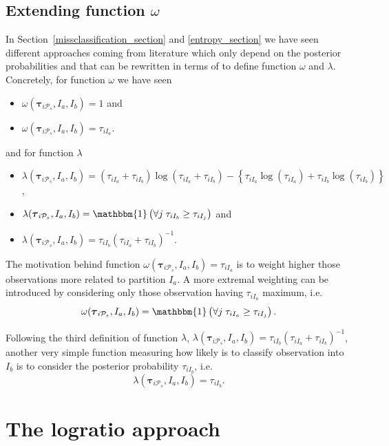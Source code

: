 \documentclass[10pt, a4paper]{article}
\newcommand{\m}[1]{\boldsymbol{#1}}
\begin{document}
\begin{spacing}{1.9}
\subsection{Extending function $\omega$}

In Section~\ref{missclassification_section} and \ref{entropy_section} we have seen different approaches coming from literature which only depend on the posterior probabilities and that can be rewritten in terms of to define function $\omega$ and $\lambda$. Concretely, for function $\omega$ we have seen
\begin{itemize}
\item $\omega(\m\tau_{i \mathcal{P}_s},  I_a,  I_b) = 1$ and
\item $\omega(\m\tau_{i \mathcal{P}_s},  I_a,  I_b) = \tau_{iI_a}$.
\end{itemize}
and for function $\lambda$ 
\begin{itemize}
\item $\lambda(\m\tau_{i \mathcal{P}_s},  I_a,  I_b) =  (\tau_{iI_a}+\tau_{iI_b}) \log(\tau_{iI_a} + \tau_{iI_b}) - \left\{ \tau_{iI_a} \log(\tau_{iI_a}) + \tau_{iI_b} \log(\tau_{iI_b}) \right\}$,
\item $\lambda(\m\tau_{i \mathcal{P}_s},  I_a,  I_b) = \mathbbm{1}\left( \forall j\; \tau_{i I_{b}} \geq \tau_{iI_j} \right)$ and
\item $\lambda(\m\tau_{i \mathcal{P}_s},  I_a,  I_b) = \tau_{iI_b} (\tau_{iI_a} + \tau_{iI_b})^{-1}$.
\end{itemize}

The motivation behind function $\omega(\m\tau_{i \mathcal{P}_s},  I_a,  I_b) = \tau_{iI_a}$ is to weight higher those observations more related to partition $I_a$. A more extremal weighting can be introduced by considering only those observation having $ \tau_{iI_a}$ maximum, i.e.
\[
\omega(\m\tau_{i \mathcal{P}_s},  I_a,  I_b) = \mathbbm{1}\left( \forall j\; \tau_{i I_{a}} \geq \tau_{iI_j} \right).
\]

Following the third definition of function $\lambda$, $\lambda(\m\tau_{i \mathcal{P}_s},  I_a,  I_b) = \tau_{iI_b} (\tau_{iI_a} + \tau_{iI_b})^{-1}$, another very simple function measuring how likely is to classify observation into $I_b$ is to consider the posterior probability $\tau_{i I_{b}}$, i.e.
\[
\lambda(\m\tau_{i \mathcal{P}_s},  I_a,  I_b) = \tau_{iI_b}.
\]

\section{The logratio approach}\label{logratio_section}


\end{spacing}
\end{document}

